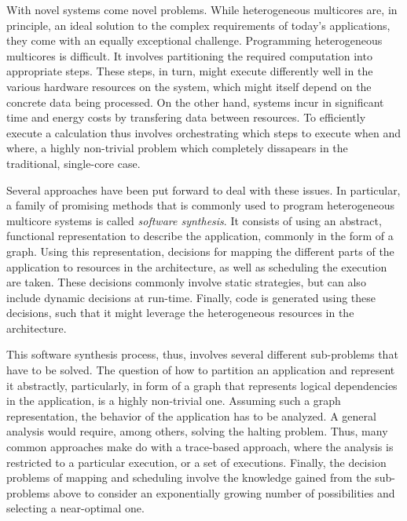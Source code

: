 \documentclass[sigplan,10pt]{acmart}
\begin{document}
With novel systems come novel problems. While heterogeneous multicores are, in principle, an ideal solution to the complex requirements of today's applications, they come with an equally exceptional challenge.
Programming heterogeneous multicores is difficult. It involves partitioning the required computation into appropriate steps. These steps, in turn, might execute differently well in the various hardware resources on the system,
which might itself depend on the concrete data being processed.
On the other hand, systems incur in significant time and energy costs by transfering data between resources.
To efficiently execute a calculation thus involves orchestrating which steps to execute when and where, a highly non-trivial problem which completely dissapears in the traditional, single-core case.

Several approaches have been put forward to deal with these issues.
In particular, a family of promising methods that is commonly used to program heterogeneous multicore systems is called \emph{software synthesis}\cite{bhattacharyya2012software,sgroi1999synthesis}.
It consists of using an abstract, functional representation to describe the application, commonly in the form of a graph. Using this representation,
decisions for mapping the different parts of the application to resources in the architecture, as well as scheduling the execution are taken. These decisions commonly involve static strategies,
but can also include dynamic decisions at run-time. Finally, code is generated using these decisions, such that it might leverage the heterogeneous resources in the architecture.

This software synthesis process, thus, involves several different sub-problems that have to be solved.
The question of how to partition an application and represent it abstractly, particularly, in form of a graph that represents logical dependencies in the application, is a highly non-trivial one.
Assuming such a graph representation, the behavior of the application has to be analyzed.
A general analysis would require, among others, solving the halting problem.
Thus, many common approaches make do with a trace-based approach, where the analysis is restricted to a particular execution, or a set of executions.
Finally, the decision problems of mapping and scheduling involve the knowledge gained from the sub-problems above to consider an exponentially growing number of possibilities and selecting a near-optimal one.
\end{document}
